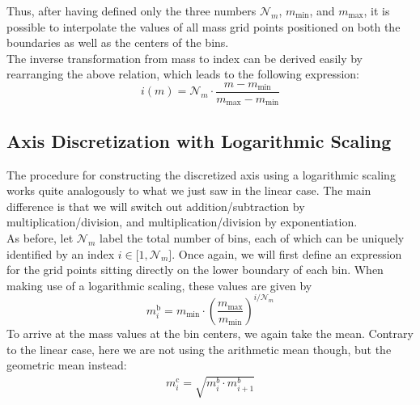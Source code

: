         Thus, after having defined only the three numbers $\mathcal N_m$, $m_\text{min}$, and 
        $m_\text{max}$, it is possible to interpolate the values of all mass grid points positioned 
        on both the boundaries as well as the  centers of the bins. \\
        
        The inverse transformation from mass to index can be derived easily by rearranging the 
        above relation, which leads to the following expression:
        \begin{equation}
            i(m)
                =\mathcal N_m\cdot\frac{m-m_\text{min}}{m_\text{max}-m_\text{min}}
        \end{equation}
        
 
    \subsection{Axis Discretization with Logarithmic Scaling}
    \label{subsec:axis_discretization_with_logarithmic_scale}

        The procedure for constructing the discretized axis using a logarithmic scaling works quite
        analogously to what we just saw in the linear case. The main difference is that we will 
        switch out addition/subtraction by multiplication/division, and multiplication/division 
        by exponentiation.
        \\

        As before, let $\mathcal N_m$ label the total number of bins, each of which can be uniquely 
        identified by an index $i\in\mathcal[1,\mathcal N_m]$. Once again, we will first define 
        an expression for the grid points sitting directly on the lower boundary of each bin. When
        making use of a logarithmic scaling, these values are given by
        \begin{equation}
            m_i^\text{b}
                =m_\text{min}\cdot\left(\frac{m_\text{max}}{m_\text{min}}\right)^{i/\mathcal N_m}
        \end{equation}
        To arrive at the mass values at the bin centers, we again take the mean. Contrary to the 
        linear case, here we are not using the arithmetic mean though, but the geometric mean
        instead:
        \begin{align}
            m_i^\text{c} =\sqrt{m_i^b\cdot m_{i+1}^b}
        \end{align}
    
